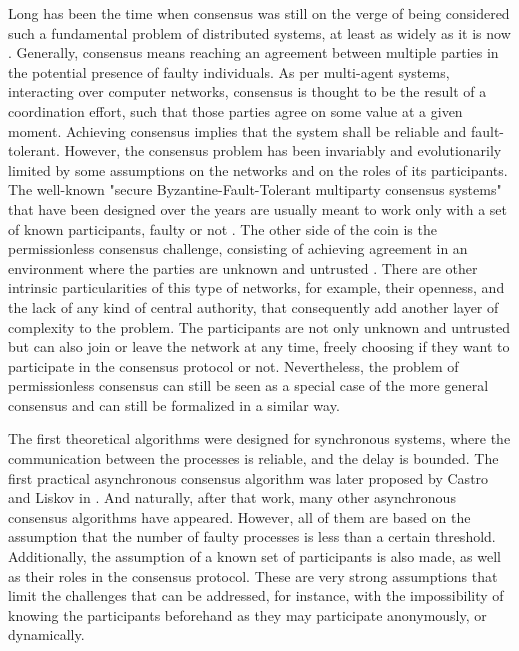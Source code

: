 Long has been the time when consensus was still on the verge of being considered such a fundamental problem of distributed systems, at least as widely as it is now \cite{pease1980reaching, lamport2019byzantine, lamport1983weak}. Generally, consensus means reaching an agreement between multiple parties in the potential presence of faulty individuals. As per multi-agent systems, interacting over computer networks, consensus is thought to be the result of a coordination effort, such that those parties agree on some value at a given moment. Achieving consensus implies that the system shall be reliable and fault-tolerant. However, the consensus problem has been invariably and evolutionarily limited by some assumptions on the networks and on the roles of its participants. The well-known "secure Byzantine-Fault-Tolerant multiparty consensus systems" that have been designed over the years are usually meant to work only with a set of known participants, faulty or not \cite{castro1999practical}. The other side of the coin is the permissionless consensus challenge, consisting of achieving agreement in an environment where the parties are unknown and untrusted \cite{nakamoto2008bitcoin, buterin2014next}. There are other intrinsic particularities of this type of networks, for example, their openness, and the lack of any kind of central authority, that consequently add another layer of complexity to the problem. The participants are not only unknown and untrusted but can also join or leave the network at any time, freely choosing if they want to participate in the consensus protocol or not. Nevertheless, the problem of permissionless consensus can still be seen as a special case of the more general consensus and can still be formalized in a similar way.

The first theoretical algorithms were designed for synchronous systems, where the communication between the processes is reliable, and the delay is bounded. 
The first practical asynchronous consensus algorithm was later proposed by Castro and Liskov in \cite{castro1999practical}. And naturally, after that work, many other asynchronous consensus algorithms have appeared. However, all of them are based on the assumption that the number of faulty processes is less than a certain threshold. Additionally, the assumption of a known set of participants is also made, as well as their roles in the consensus protocol. These are very strong assumptions that limit the challenges that can be addressed, for instance, with the impossibility of knowing the participants beforehand as they may participate anonymously, or dynamically.

